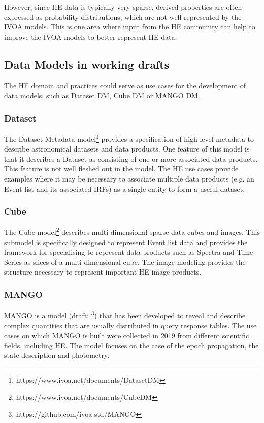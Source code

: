 \documentclass[11pt,a4paper]{ivoa}
\begin{document}
{However, since HE data is typically very sparse, derived properties are often expressed as probability distributions, which are not
well represented by the IVOA models.  This is one area where input from the HE community can help to improve the IVOA models to better
represent HE data.


\subsection{Data Models in working drafts}

The HE domain and practices could serve as use cases for the development of data models, such as Dataset DM, Cube DM or MANGO DM.

\subsubsection{Dataset}

The Dataset Metadata model\footnote{https://www.ivoa.net/documents/DatasetDM} provides a specification of high-level metadata to describe astronomical datasets and data products.
One feature of this model is that it describes a Dataset as consisting of one or more associated data products.  This feature is not
well fleshed out in the model.  The HE use cases provide examples where it may be necessary to associate multiple data products
(e.g. an Event list and its associated IRFs) as a single entity to form a useful dataset.

\subsubsection{Cube}

The Cube model\footnote{https://www.ivoa.net/documents/CubeDM} describes multi-dimensional sparse data cubes and images.  This submodel is specifically designed to
represent Event list data and provides the framework for specialising to represent data products such as Spectra and Time Series
as slices of a multi-dimensional cube.  The image modeling provides the structure necessary to represent important HE image products.

\subsubsection{MANGO}

MANGO is a model (draft: \footnote{https://github.com/ivoa-std/MANGO}) that has been developed to reveal
and describe complex quantities that are usually distributed in query response tables.
The use cases on which MANGO is built were collected in 2019 from different scientific fields, including HE.
The model focuses on the case of the epoch propagation, the state description and photometry.

}
\end{document}
